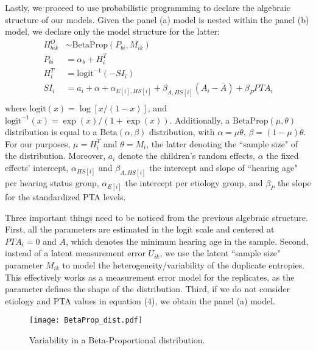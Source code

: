 Lastly, we proceed to use probabilistic programming to declare the algebraic structure of our models. Given the panel (a) model is nested within the panel (b) model, we declare only the model structure for the latter:
%
\begin{align}
	H^{O}_{bik} & \sim \text{BetaProp} \left( P_{bi}, M_{ik} \right) \\ 
	P_{bi} &= \alpha_{b} + H^{T}_{i} \\
	H^{T}_{i} &= \text{logit}^{-1}( -SI_{i} ) \\
	SI_{i} & = a_{i} + \alpha + \alpha_{E[i],HS[i]} + \beta_{A, HS[i]} (A_{i} - \bar{A}) + \beta_{P} PTA_{i} \\ 
\end{align}
%
where $\text{logit}(x) = \log \left[ x / ( 1 - x ) \right]$, and $\text{logit}^{-1}(x) = \exp(x) / ( 1 + \exp(x) ) $. Additionally, a $\text{BetaProp}(\mu, \theta)$ distribution is equal to a $\text{Beta}(\alpha, \beta)$ distribution, with $\alpha=\mu \theta$, $\beta=(1-\mu)\theta$. For our purposes, $\mu = H^{T}_{i}$ and $\theta = M_{i}$, the latter denoting the ``sample size" of the distribution. Moreover, $a_{i}$ denote the children's random effects, $\alpha$ the fixed effects' intercept, $\alpha_{HS[i]}$ and $\beta_{A, HS[i]}$ the intercept and slope of ``hearing age" per hearing status group, $\alpha_{E[i]}$ the intercept per etiology group, and $\beta_{P}$ the slope for the standardized PTA levels. 

Three important things need to be noticed from the previous algebraic structure. First, all the parameters are estimated in the logit scale and centered at $PTA_{i}=0$ and $\bar{A}$, which denotes the minimum hearing age in the sample. Second, instead of a latent measurement error $U_{ik}$, we use the latent ``sample size" parameter $M_{ik}$ to model the heterogeneity/variability of the duplicate entropies. This effectively works as a measurement error model for the replicates, as the parameter defines the shape of the distribution. Third, if we do not consider etiology and PTA values in equation (4), we obtain the panel (a) model.
%
\begin{figure}
	\centering
	\texttt{[image: BetaProp\_dist.pdf]}
	\caption[Variability in a Beta-Proportional distribution]{Variability in a Beta-Proportional distribution.}
	\label{fig:BetaProp}
\end{figure}
%
%
